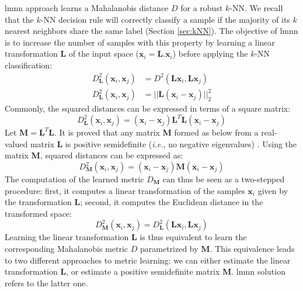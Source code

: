{\sc lmnn} approach learns a Mahalanobis distance $D$ for a robust $k$-NN. We recall that the $k$-NN decision rule will correctly classify a sample if the majority of its $k$ nearest neighbors share the same label (Section \ref{sec:kNN}). 
The objective of {\sc lmnn} is to increase the number of samples with this property by learning a linear transformation $\textbf{L}$ of the input space ($\textbf{x}_i=\textbf{L}.\textbf{x}_i$) before applying the $k$-NN classification:
\begin{align}
D^2_\textbf{L}(\textbf{x}_i,\textbf{x}_j) &= D^2(\textbf{L} \textbf{x}_i,\textbf{L} \textbf{x}_j) \\
D_\textbf{L}^2(\textbf{x}_i,\textbf{x}_j) & = ||\textbf{L}(\textbf{x}_i-\textbf{x}_j)||_2^2
\label{eq:lin}
\end{align}
Commonly, the squared distances can be expressed in terms of a square matrix:
\begin{equation}
D^2_\textbf{L}(\textbf{x}_i,\textbf{x}_j) = (\textbf{x}_i-\textbf{x}_j)\textbf{L}^T\textbf{L}(\textbf{x}_i-\textbf{x}_j)
\end{equation}
Let $\textbf{M} = \textbf{L}^T\textbf{L}$. It is proved that any matrix \textbf{M} formed as below from a real-valued matrix \textbf{L} is positive semidefinite (\textit{i.e.}, no negative eigenvalues) \cite{Weinberger2009}. Using the matrix \textbf{M}, squared distances can be expressed as:
\begin{equation}
D^2_\textbf{M}(\textbf{x}_i,\textbf{x}_j) = (\textbf{x}_i-\textbf{x}_j)\textbf{M}(\textbf{x}_i-\textbf{x}_j)
\end{equation}
\noindent The computation of the learned metric $D_\textbf{M}$ can thus be seen as a two-stepped procedure: first, it computes a linear transformation of the samples $\textbf{x}_i$ given by the transformation $\textbf{L}$; second, it computes the Euclidean distance in the transformed space:
\begin{equation}
D^2_\textbf{M}(\textbf{x}_i,\textbf{x}_j) = D^2_\textbf{L}(\textbf{L} \textbf{x}_i,\textbf{L} \textbf{x}_j)
\end{equation}
Learning the linear transformation $\textbf{L}$ is thus equivalent to learn the corresponding Mahalanobis metric $D$ parametrized by $\textbf{M}$. This equivalence leads to two different approaches to metric learning: we can either estimate the linear transformation $\textbf{L}$, or estimate a positive semidefinite matrix $\textbf{M}$. {\sc lmnn} solution refers to the latter one.



